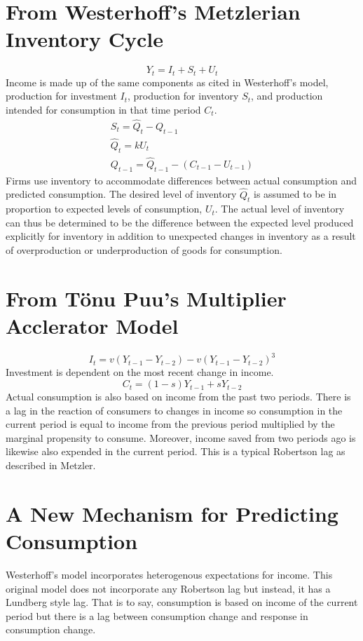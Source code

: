 \documentclass[]{article}
\begin{document}
\section*{From Westerhoff's Metzlerian Inventory Cycle}
\begin{equation}
	Y_t=I_t+S_t+U_t
\end{equation}
Income is made up of the same components as cited in Westerhoff's model, production for investment $I_t$, production for inventory $S_t$, and production intended for consumption in that time period $C_t$.
\begin{gather}
	S_t=\hat Q_t -Q_{t-1}\\
	\hat Q_t=k U_t\\
	Q_{t-1}=\hat Q_{t-1}-(C_{t-1}-U_{t-1})
\end{gather}
Firms use inventory to accommodate differences between actual consumption and predicted consumption. The desired level of inventory $\hat Q_t$ is assumed to be in proportion to expected levels of consumption, $U_t$. The actual level of inventory can thus be determined to be the difference between the expected level produced explicitly for inventory in addition to unexpected changes in inventory as a result of overproduction or underproduction of goods for consumption.
\section*{From T\"{o}nu Puu's Multiplier Acclerator Model}
\begin{equation}
	I_t=v(Y_{t-1}-Y_{t-2})-v(Y_{t-1}-Y_{t-2})^3
\end{equation}
Investment is dependent on the most recent change in income.
\begin{equation}
	C_t=(1-s)Y_{t-1}+sY_{t-2}
\end{equation}
Actual consumption is also based on income from the past two periods. There is a lag in the reaction of consumers to changes in income so consumption in the current period is equal to income from the previous period multiplied by the marginal propensity to consume. Moreover, income saved from two periods ago is likewise also expended in the current period. This is a typical Robertson lag as described in Metzler.
\section*{A New Mechanism for Predicting Consumption}
Westerhoff's model incorporates heterogenous expectations for income. This original model does not incorporate any Robertson lag but instead, it has a Lundberg style lag. That is to say, consumption is based on income of the current period but there is a lag between consumption change and response in consumption change. 
\end{document}
